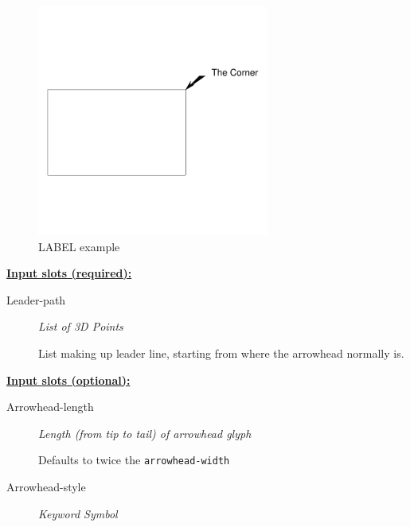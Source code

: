 \documentclass [11pt]{book}
\begin{document}
\begin{itemize}
\begin{figure}
\end{figure}

\begin{figure}
\begin{center}
\includegraphics[width=3in,height=3in]{../images/example-label.pdf}
\end{center}

\caption{LABEL example}

\label{fig:LABEL}

\end{figure}





\textbf{
\underline{Input slots (required):}}

\begin{description}

\item [Leader-path]
\emph{List of 3D Points}

 List making up leader line, starting from where the arrowhead normally is.




\end{description}






\textbf{
\underline{Input slots (optional):}}

\begin{description}

\item [Arrowhead-length]
\emph{Length (from tip to tail) of arrowhead glyph}

 Defaults to twice the \texttt{arrowhead-width}




\item [Arrowhead-style]
\emph{Keyword Symbol}


\end{description}
\end{itemize}
\end{document}
